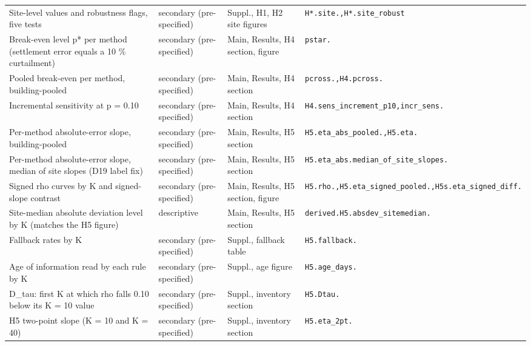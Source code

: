 {\begin{longtable}{@{}>{\raggedright\arraybackslash}p{}>{\raggedright\arraybackslash}p{}>{\raggedright\arraybackslash}p{}>{\raggedright\arraybackslash}p{}@{}}
Site-level values and robustness flags, five tests & secondary (pre-specified) & Suppl., H1, H2 site figures & \texttt{H{*}.\allowbreak site.\allowbreak {*},\allowbreak  H{*}.\allowbreak site\_robust} \\
Break-even level p{*} per method (settlement error equals a 10 \% curtailment) & secondary (pre-specified) & Main, Results, H4 section, figure & \texttt{pstar.\allowbreak {*}} \\
Pooled break-even per method, building-pooled & secondary (pre-specified) & Main, Results, H4 section & \texttt{pcross.\allowbreak {*},\allowbreak  H4.\allowbreak pcross.\allowbreak {*}} \\
Incremental sensitivity at p = 0.10 & secondary (pre-specified) & Main, Results, H4 section & \texttt{H4.\allowbreak sens\_increment\_p10,\allowbreak  incr\_sens.\allowbreak {*}} \\
Per-method absolute-error slope, building-pooled & secondary (pre-specified) & Main, Results, H5 section & \texttt{H5.\allowbreak eta\_abs\_pooled.\allowbreak {*},\allowbreak  H5.\allowbreak eta.\allowbreak {*}} \\
Per-method absolute-error slope, median of site slopes (D19 label fix) & secondary (pre-specified) & Main, Results, H5 section & \texttt{H5.\allowbreak eta\_abs.\allowbreak median\_of\_site\_slopes.\allowbreak {*}} \\
Signed rho curves by K and signed-slope contrast & secondary (pre-specified) & Main, Results, H5 section, figure & \texttt{H5.\allowbreak rho.\allowbreak {*},\allowbreak  H5.\allowbreak eta\_signed\_pooled.\allowbreak {*},\allowbreak  H5s.\allowbreak eta\_signed\_diff.\allowbreak {*}} \\
Site-median absolute deviation level by K (matches the H5 figure) & descriptive & Main, Results, H5 section & \texttt{derived.\allowbreak H5.\allowbreak absdev\_sitemedian.\allowbreak {*}} \\
Fallback rates by K & secondary (pre-specified) & Suppl., fallback table & \texttt{H5.\allowbreak fallback.\allowbreak {*}} \\
Age of information read by each rule by K & secondary (pre-specified) & Suppl., age figure & \texttt{H5.\allowbreak age\_days.\allowbreak {*}} \\
D\_tau: first K at which rho falls 0.10 below its K = 10 value & secondary (pre-specified) & Suppl., inventory section & \texttt{H5.\allowbreak Dtau.\allowbreak {*}} \\
H5 two-point slope (K = 10 and K = 40) & secondary (pre-specified) & Suppl., inventory section & \texttt{H5.\allowbreak eta\_2pt.\allowbreak {*}} \\

\end{longtable}}
